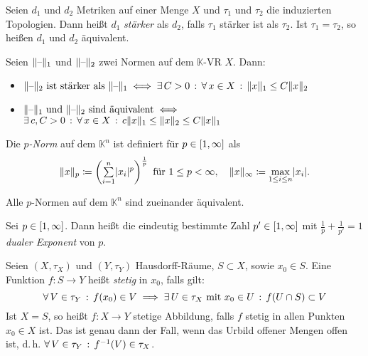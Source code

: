 \documentclass{cheat-sheet}
\newcommand{\K}{\mathbb{K}}
\begin{document}
\begin{defn}
  Seien $d_1$ und $d_2$ Metriken auf einer Menge $X$ und $\tau_1$ und $\tau_2$ die induzierten Topologien. Dann heißt $d_1$ \emph{stärker} als $d_2$, falls $\tau_1$ stärker ist als $\tau_2$. Ist $\tau_1 = \tau_2$, so heißen $d_1$ und $d_2$ äquivalent.
\end{defn}


\begin{satz}
  Seien $\lVert\text{--}\rVert_1$ und $\lVert\text{--}\rVert_2$ zwei Normen auf dem $\K$-VR $X$. Dann:
  \begin{itemize}
    \item $\lVert\text{--}\rVert_2 \text{ ist stärker als } \lVert\text{--}\rVert_1 \iff \exists \, {C > 0} \,:\, \forall \, {x \in X} \,:\, \lVert x\rVert_1 \leq C \lVert x\rVert_2$
    \item $\lVert\text{--}\rVert_1 \text{ und } \lVert\text{--}\rVert_2 \text{ sind äquivalent} \iff $\\
    $\exists \, {c, C > 0} \,:\, \forall \, {x \in X} \,:\, c \lVert x\rVert_1 \leq \lVert x\rVert_2 \leq C \lVert x\rVert_1$
  \end{itemize}
\end{satz}

\begin{defn}
  Die \emph{$p$-Norm} auf dem $\K^n$ ist definiert für $p \in \left[ 1, \infty \right]$ als
  \[
    \norm{x}_p \coloneqq \left( \sum_{i = 1}^n \abs{x_i}^p \right)^{\frac{1}{p}} \text{ für } 1 \leq p < \infty, \quad
    \norm{x}_{\infty} \coloneqq \max_{1 \leq i \leq n} \abs{x_i}.
  \]
\end{defn}

\begin{bem}
  Alle $p$-Normen auf dem $\K^n$ sind zueinander äquivalent.
\end{bem}

\begin{defn}
  Sei $p \in \left[ 1, \infty \right]$. Dann heißt die eindeutig bestimmte Zahl $p' \in \left[ 1, \infty \right]$ mit $\tfrac{1}{p} + \tfrac{1}{p'} = 1$ \emph{dualer Exponent} von $p$.
\end{defn}



\begin{defn}
  Seien $(X, \tau_X)$ und $(Y, \tau_Y)$ Hausdorff-Räume, $S \subset X$, sowie $x_0 \in S$. Eine Funktion $f : S \to Y$ heißt \emph{stetig} in $x_0$, falls gilt:
  \[ \forall \, {V \in \tau_Y} \,:\, f(x_0) \in V \implies \exists \, {U \in \tau_X \text{ mit } x_0 \in U} \,:\, f(U \cap S) \subset V \]
  Ist $X = S$, so heißt $f : X \to Y$ stetige Abbildung, falls $f$ stetig in allen Punkten $x_0 \in X$ ist. Das ist genau dann der Fall, wenn das Urbild offener Mengen offen ist, d.\,h. $\forall \, {V \in \tau_Y} \,:\, f^{-1}(V) \in \tau_X$.
\end{defn}
\end{document}
